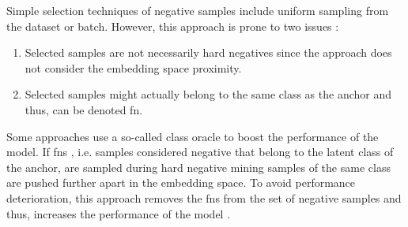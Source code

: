 Simple selection techniques of negative samples include uniform sampling from the dataset or batch.
However, this approach is prone to two issues \citet{robinson_contrastive_2021,mining_potential_2024}:
\begin{enumerate}
    \item Selected samples are not necessarily hard negatives since the approach does not consider the embedding space proximity.
    \item Selected samples might actually belong to the same class as the anchor and thus, can be denoted \ac{fn}.
\end{enumerate}

Some approaches use a so-called class oracle to boost the performance of the model.
If \acp{fn} \cite{grape_2024,curricular_weighting_2024,progcl_2022}, i.e. samples considered negative that belong to the latent class of the anchor,
 are sampled during hard negative mining samples of the same class are pushed further apart in the embedding space. 
To avoid performance deterioration, this approach removes the \acp{fn} from the set of negative samples and thus, 
increases the performance of the model \citet{mochi_2020}.